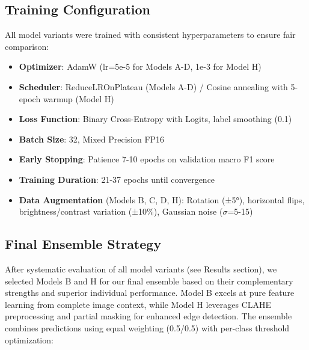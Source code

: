 \documentclass[12pt]{article}
\begin{document}
\subsection{Training Configuration}

All model variants were trained with consistent hyperparameters to ensure fair comparison:

\begin{itemize}[itemsep=1pt,parsep=0pt,topsep=3pt]
\item \textbf{Optimizer}: AdamW (lr=5e-5 for Models A-D, 1e-3 for Model H)
\item \textbf{Scheduler}: ReduceLROnPlateau (Models A-D) / Cosine annealing with 5-epoch warmup (Model H)
\item \textbf{Loss Function}: Binary Cross-Entropy with Logits, label smoothing (0.1)
\item \textbf{Batch Size}: 32, Mixed Precision FP16
\item \textbf{Early Stopping}: Patience 7-10 epochs on validation macro F1 score
\item \textbf{Training Duration}: 21-37 epochs until convergence
\item \textbf{Data Augmentation} (Models B, C, D, H): Rotation (±5°), horizontal flips, brightness/contrast variation (±10\%), Gaussian noise ($\sigma$=5-15)
\end{itemize}

\subsection{Final Ensemble Strategy}

After systematic evaluation of all model variants (see Results section), we selected Models B and H for our final ensemble based on their complementary strengths and superior individual performance. Model B excels at pure feature learning from complete image context, while Model H leverages CLAHE preprocessing and partial masking for enhanced edge detection. The ensemble combines predictions using equal weighting (0.5/0.5) with per-class threshold optimization:
\end{document}
